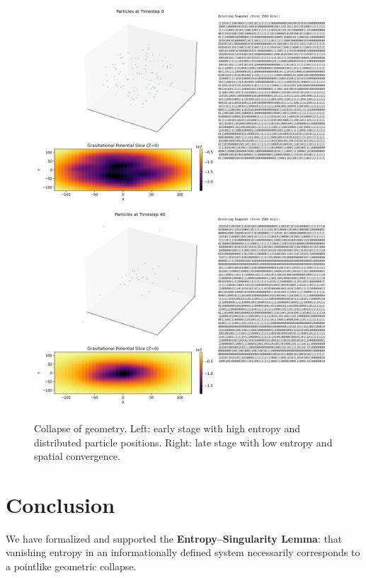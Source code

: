 \documentclass[11pt]{article}
\begin{document}
\begin{figure}[h!]
  \centering
  \includegraphics[width=\textwidth]{figures/collapse_0.png}
  \includegraphics[width=\textwidth]{figures/collapse_40.png}
  \caption{Collapse of geometry. Left: early stage with high entropy and distributed particle positions. Right: late stage with low entropy and spatial convergence.}
  \label{fig:spacetime_collapse}
\end{figure}



\section{Conclusion}


We have formalized and supported the \textbf{Entropy--Singularity Lemma}: that vanishing entropy in an informationally defined system necessarily corresponds to a pointlike geometric collapse.
\end{document}
